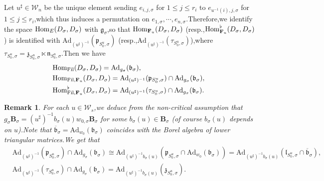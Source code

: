 \documentclass[10pt]{article}
\newtheorem{rmk}[thm]{Remark}
\newcommand{\fil}{{\rm Fil}}
\newcommand{\homo}{{\rm Hom}}
\newcommand{\bB}{{\mathbf{B}}}
\newcommand{\bF}{{\mathbf{F}}}
\newcommand{\fb}{{\mathfrak{b}}}
\newcommand{\fg}{{\mathfrak{g}}}
\newcommand{\fl}{{\mathfrak{l}}}
\newcommand{\fn}{{\mathfrak{n}}}
\newcommand{\fp}{{\mathfrak{p}}}
\newcommand{\fz}{{\mathfrak{z}}}
\newcommand{\sW}{\mathscr W}
\begin{document}
Let $u^{\sharp}\in \sW_n$ be the unique element sending $e_{i,j,\sigma}$ for $1\leq j\leq r_i$ to $e_{u^{-1}(i),j,\sigma}$ for $1\leq j\leq r_i$,\;which thus induces a permutation on $e_{1,\sigma},\cdots,e_{n,\sigma}$.\;Therefore,\;we identify the space $\homo_{E}(D_{\sigma},D_{\sigma})$ with $\fg_{\sigma}$,\;so that
 $\homo_{\bF_u}(D_{\sigma},D_{\sigma})$ (resp.,\;$\homo^{\flat}_{\bF_u}(D_{\sigma},D_{\sigma})$) is identified with $\mathrm{Ad}_{(u^{\sharp})^{-1}}(\fp_{S^u_0,\sigma})$ (resp.,\;$\mathrm{Ad}_{(u^{\sharp})^{-1}}(\tau_{S^u_0,\sigma})$),\;where $\tau_{S^u_0,\sigma}=\fz_{S^u_0,\sigma}\ltimes\fn_{S^u_0,\sigma}$.\;Then we have 
\begin{equation}
	\begin{aligned}
		&\homo_{\fil}(D_{\sigma},D_{\sigma})=\mathrm{Ad}_{g_{\sigma}}(\fb_{\sigma}),\\
		&\homo_{\fil,\bF_u}(D_{\sigma},D_{\sigma})=\mathrm{Ad}_{(u^{\sharp})^{-1}}(\fp_{S^u_0,\sigma})\cap \mathrm{Ad}_{g_{\sigma}}(\fb_{\sigma}),\\
		&\homo^{\flat}_{\fil,\bF_u}(D_{\sigma},D_{\sigma})=\mathrm{Ad}_{(u^{\sharp})^{-1}}(\tau_{S^u_0,\sigma})\cap \mathrm{Ad}_{g_{\sigma}}(\fb_{\sigma}).\;
	\end{aligned}
\end{equation}
\begin{rmk}\label{explainHomasLiealg}For each $u\in \sW_s$,\;we deduce from the non-critical assumption that $g_{\sigma}\bB_{\sigma}=(u^{\sharp})^{-1}b_{\sigma}(u)w_{0,\sigma}\bB_{\sigma}$ for some $b_{\sigma}(u)\in \bB_{\sigma}$ (of course $b_{\sigma}(u)$ depends on $u$).\;Note that $\overline{\fb}_{\sigma}=\mathrm{Ad}_{w_0}(\fb_{\sigma})$ coincides with the Borel algebra of lower triangular matrices.\;We get that 
	\begin{equation}\label{noncriticalintersection}
		\begin{aligned}
			&\mathrm{Ad}_{(u^{\sharp})^{-1}}(\fp_{S^u_0,\sigma})\cap \mathrm{Ad}_{g_{\sigma}}(\fb_{\sigma})\cong \mathrm{Ad}_{(u^{\sharp})^{-1}b_{\sigma}(u)}(\fp_{S^u_0,\sigma}\cap \mathrm{Ad}_{w_0}(\fb_{\sigma}))=\mathrm{Ad}_{(u^{\sharp})^{-1}b_{\sigma}(u)}(\fl_{S^u_0,\sigma}\cap \overline{\fb}_{\sigma}),\\
			&\mathrm{Ad}_{(u^{\sharp})^{-1}}(\tau_{S^u_0,\sigma})\cap \mathrm{Ad}_{g_{\sigma}}(\fb_{\sigma})=\mathrm{Ad}_{(u^{\sharp})^{-1}b_{\sigma}(u)}(\fz_{S^u_0,\sigma}).
		\end{aligned}
	\end{equation}
\end{rmk}
\end{document}
